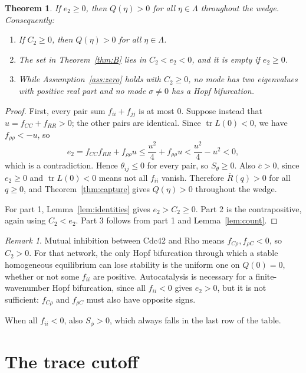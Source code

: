 \documentclass[11pt]{article}
\newtheorem{theorem}{Theorem}
\theoremstyle{definition}
\theoremstyle{remark}
\newtheorem{remark}{Remark}
\begin{document}
\begin{theorem}\label{thm:C2}
If $e_2\ge0$, then $Q(\eta)>0$ for all $\eta\in\Lambda$ throughout the wedge. Consequently:
\begin{enumerate}
\item If $C_2\ge0$, then $Q(\eta)>0$ for all $\eta\in\Lambda$.
\item The set in Theorem~\ref{thm:B} lies in $C_2<e_2<0$, and it is empty if $e_2\ge0$.
\item While Assumption~\ref{ass:zero} holds with $C_2\ge0$, no mode has two eigenvalues with positive real part and no mode $\sigma\neq0$ has a Hopf bifurcation.
\end{enumerate}
\end{theorem}

\begin{proof}
First, every pair sum $f_{ii}+f_{jj}$ is at most $0$. Suppose instead that $u=f_{CC}+f_{RR}>0$; the other pairs are identical. Since $\operatorname{tr}L(0)<0$, we have $f_{\rho\rho}<-u$, so
\[
e_2=f_{CC}f_{RR}+f_{\rho\rho}u\le\frac{u^2}{4}+f_{\rho\rho}u<\frac{u^2}{4}-u^2<0,
\]
which is a contradiction. Hence $\theta_{ij}\le0$ for every pair, so $S_\theta\ge0$. Also $\bar c>0$, since $e_2\ge0$ and $\operatorname{tr}L(0)<0$ means not all $f_{ii}$ vanish. Therefore $\overline{R}(q)>0$ for all $q\ge0$, and Theorem~\ref{thm:capture} gives $Q(\eta)>0$ throughout the wedge.

For part 1, Lemma~\ref{lem:identities} gives $e_2>C_2\ge0$. Part 2 is the contrapositive, again using $C_2<e_2$. Part 3 follows from part 1 and Lemma~\ref{lem:count}.
\end{proof}

\begin{remark}
Mutual inhibition between Cdc42 and Rho means $f_{C\rho},f_{\rho C}<0$, so $C_2>0$. For that network, the only Hopf bifurcation through which a stable homogeneous equilibrium can lose stability is the uniform one on $Q(0)=0$, whether or not some $f_{ii}$ are positive. Autocatalysis is necessary for a finite-wavenumber Hopf bifurcation, since all $f_{ii}<0$ gives $e_2>0$, but it is not sufficient: $f_{C\rho}$ and $f_{\rho C}$ must also have opposite signs.

When all $f_{ii}<0$, also $S_\phi>0$, which always falls in the last row of the table.
\end{remark}

\section{The trace cutoff}
\end{document}
